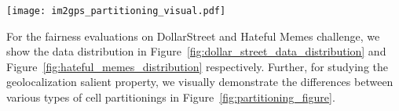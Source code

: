 \documentclass[10pt,twocolumn,letterpaper]{article}
\begin{document}
\begin{figure*}[t]
  \centering
  \texttt{[image: im2gps\_partitioning\_visual.pdf]}
  \caption{
    The im2gps evaluation requires finetuning a classification model on either coarse, medium, or fine partitionings of the world. The model outputs a probability distribution over these partitions, we predict the partition with the greatest probability, and choose the mean latitude and longitude of the predicted partition for our final prediction.
  }
  \label{fig:partitioning_figure}
\end{figure*}

For the fairness evaluations on DollarStreet and Hateful Memes challenge, we show the data distribution in Figure~\ref{fig:dollar_street_data_distribution} and Figure~\ref{fig:hateful_memes_distribution} respectively. Further, for studying the geolocalization salient property, we visually demonstrate the differences between various types of cell partitionings in Figure~\ref{fig:partitioning_figure}.
\end{document}
